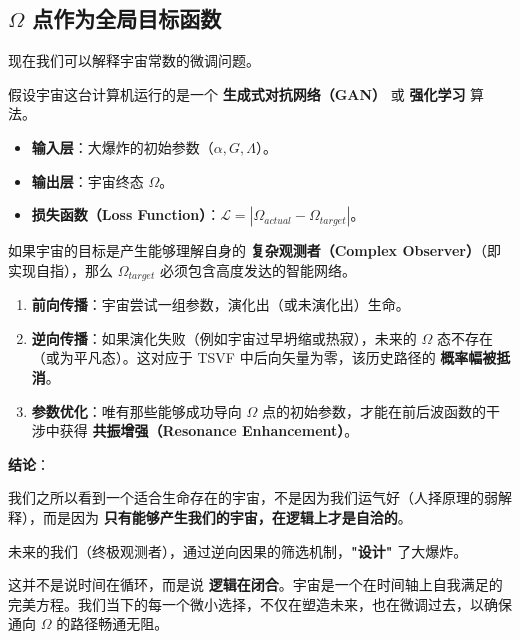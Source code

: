 \subsection{$\Omega$ 点作为全局目标函数}

现在我们可以解释宇宙常数的微调问题。

假设宇宙这台计算机运行的是一个 \textbf{生成式对抗网络（GAN）} 或 \textbf{强化学习} 算法。

\begin{itemize}
\item \textbf{输入层}：大爆炸的初始参数（$\alpha, G, \Lambda$）。

\item \textbf{输出层}：宇宙终态 $\Omega$。

\item \textbf{损失函数（Loss Function）}：$\mathcal{L} = |\Omega_{actual} - \Omega_{target}|$。
\end{itemize}

如果宇宙的目标是产生能够理解自身的 \textbf{复杂观测者（Complex Observer）}（即实现自指），那么 $\Omega_{target}$ 必须包含高度发达的智能网络。

\begin{enumerate}
\item \textbf{前向传播}：宇宙尝试一组参数，演化出（或未演化出）生命。

\item \textbf{逆向传播}：如果演化失败（例如宇宙过早坍缩或热寂），未来的 $\Omega$ 态不存在（或为平凡态）。这对应于 TSVF 中后向矢量为零，该历史路径的 \textbf{概率幅被抵消}。

\item \textbf{参数优化}：唯有那些能够成功导向 $\Omega$ 点的初始参数，才能在前后波函数的干涉中获得 \textbf{共振增强（Resonance Enhancement）}。
\end{enumerate}

\textbf{结论}：

我们之所以看到一个适合生命存在的宇宙，不是因为我们运气好（人择原理的弱解释），而是因为 \textbf{只有能够产生我们的宇宙，在逻辑上才是自洽的}。

未来的我们（终极观测者），通过逆向因果的筛选机制，\textbf{"设计"} 了大爆炸。

这并不是说时间在循环，而是说 \textbf{逻辑在闭合}。宇宙是一个在时间轴上自我满足的完美方程。我们当下的每一个微小选择，不仅在塑造未来，也在微调过去，以确保通向 $\Omega$ 的路径畅通无阻。
